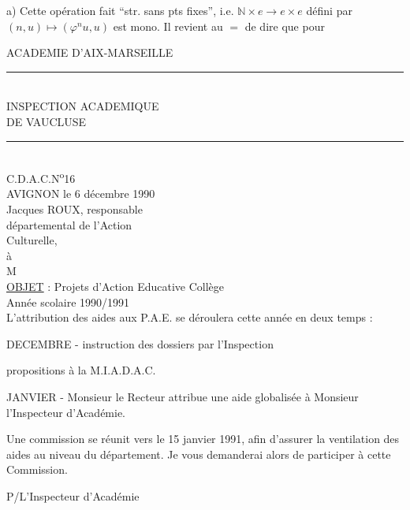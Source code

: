 a) Cette opération  fait ``str. sans pts fixes'', i.e.
$\mathbb N\times e\longrightarrow e\times e$ défini par $(n,u)\longmapsto(\varphi^n u,u)$ est
mono. Il revient au $=$ de dire que pour


ACADEMIE D'AIX-MARSEILLE\\
\rule{2cm}{0.4pt}\\
INSPECTION ACADEMIQUE\\
DE VAUCLUSE\\
\rule{0.9cm}{0.4pt}\\

C.D.A.C.N\textsuperscript{o}16\\

AVIGNON le 6 décembre 1990\\

Jacques ROUX, responsable\\
départemental de l'Action\\
Culturelle,\\

à\\
M\\

\uline{OBJET} : Projets d'Action Educative Collège \\
Année scolaire 1990/1991\\

L'attribution des aides aux P.A.E. se déroulera cette année en deux temps :

DECEMBRE \quad - instruction des dossiers par l'Inspection 

propositions à la M.I.A.D.A.C.

JANVIER \quad - Monsieur le Recteur attribue une aide globalisée à Monsieur l'Inspecteur d'Académie.

Une commission se réunit vers le 15 janvier 1991, afin d'assurer la ventilation des aides au niveau du département. Je vous demanderai alors de participer à cette Commission.

P/L'Inspecteur d'Académie\\
\\



